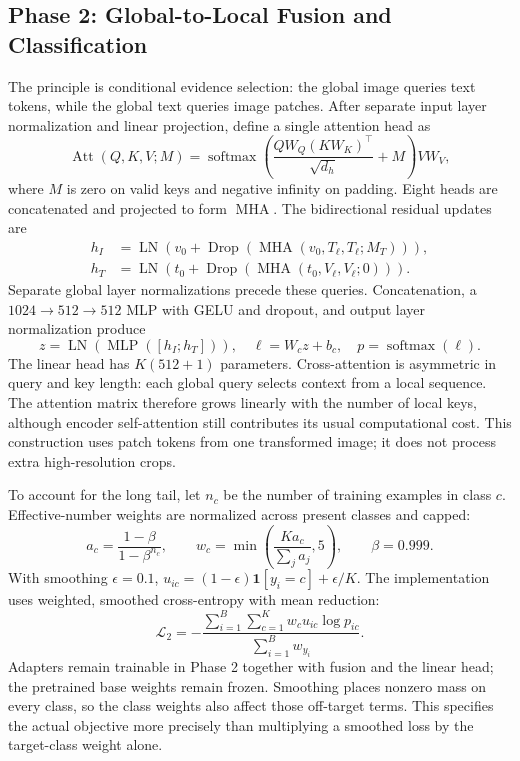 \documentclass{llncs}
\begin{document}
\subsection{Phase 2: Global-to-Local Fusion and Classification}
The principle is conditional evidence selection: the global image queries text tokens, while the global text queries image patches. After separate input layer normalization and linear projection, define a single attention head as
\begin{equation}
\operatorname{Att}(Q,K,V;M)=
\operatorname{softmax}\left(\frac{QW_Q(KW_K)^\top}{\sqrt{d_h}}+M\right)VW_V,
\label{eq:attention}
\end{equation}
where $M$ is zero on valid keys and negative infinity on padding. Eight heads are concatenated and projected to form $\operatorname{MHA}$. The bidirectional residual updates are
\begin{align}
h_I&=\operatorname{LN}\left(v_0+\operatorname{Drop}(\operatorname{MHA}(v_0,T_\ell,T_\ell;M_T))\right),\\
h_T&=\operatorname{LN}\left(t_0+\operatorname{Drop}(\operatorname{MHA}(t_0,V_\ell,V_\ell;0))\right).
\label{eq:bidirectional}
\end{align}
Separate global layer normalizations precede these queries. Concatenation, a $1024\to512\to512$ MLP with GELU and dropout, and output layer normalization produce
\begin{equation}
z=\operatorname{LN}(\operatorname{MLP}([h_I;h_T])),\quad
\ell=W_cz+b_c,\quad p=\operatorname{softmax}(\ell).
\label{eq:classifier}
\end{equation}
The linear head has $K(512+1)$ parameters. Cross-attention is asymmetric in query and key length: each global query selects context from a local sequence. The attention matrix therefore grows linearly with the number of local keys, although encoder self-attention still contributes its usual computational cost. This construction uses patch tokens from one transformed image; it does not process extra high-resolution crops.

To account for the long tail, let $n_c$ be the number of training examples in class $c$. Effective-number weights \cite{Cui2019ClassBalanced} are normalized across present classes and capped:
\begin{equation}
a_c=\frac{1-\beta}{1-\beta^{n_c}},\qquad
w_c=\min\left(\frac{Ka_c}{\sum_j a_j},5\right),\qquad\beta=0.999.
\label{eq:weights}
\end{equation}
With smoothing $\epsilon=0.1$, $u_{ic}=(1-\epsilon)\mathbf1[y_i=c]+\epsilon/K$. The implementation uses weighted, smoothed cross-entropy with mean reduction:
\begin{equation}
\mathcal L_2=-\frac{\sum_{i=1}^{B}\sum_{c=1}^{K}w_cu_{ic}\log p_{ic}}
{\sum_{i=1}^{B}w_{y_i}}.
\label{eq:loss2}
\end{equation}
Adapters remain trainable in Phase 2 together with fusion and the linear head; the pretrained base weights remain frozen. Smoothing places nonzero mass on every class, so the class weights also affect those off-target terms. This specifies the actual objective more precisely than multiplying a smoothed loss by the target-class weight alone.
\end{document}
